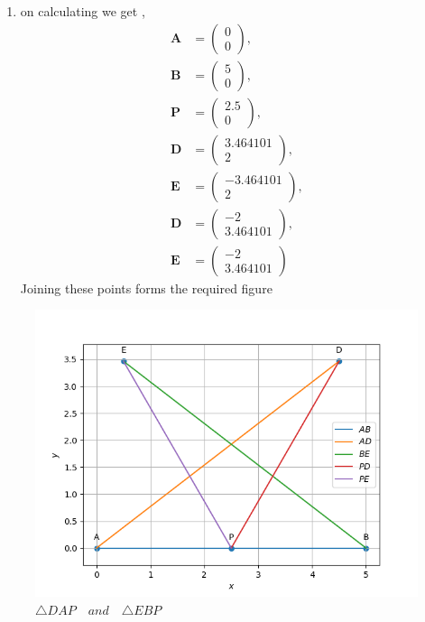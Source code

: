 \documentclass[11pt, a4paper]{article}
\newcommand{\myvec}[1]{\ensuremath{\begin{pmatrix}#1\end{pmatrix}}}
\let\vec\mathbf
\begin{document}
\begin{enumerate}
\begin{enumerate}[label=(\roman*)]
\item on calculating we get  ,
\begin{align}
\vec{A} &= \myvec{0 \\ 0},\\
\vec{B} &= \myvec{5 \\ 0} ,\\
\vec{P} &= \myvec{2.5 \\ 0} ,\\
\vec{D} &= \myvec{ 3.464101 \\ 2 } ,\\
\vec{E} &= \myvec{-3.464101  \\ 2 },\\
\vec{D} &= \myvec{ -2 \\ 3.464101 } ,\\
\vec{E} &= \myvec{ -2 \\ 3.464101 }
\end{align}
Joining these points forms the required figure

\end{enumerate}
\end{enumerate}

\begin{figure}[H]
    \includegraphics[width=\columnwidth]{figs/fig_mat_comp.png}
    \caption{$\triangle DAP \hspace{12pt} and \hspace{12pt} \triangle EBP$}
    \label{fig:fig2}
\end{figure}
\end{document}
